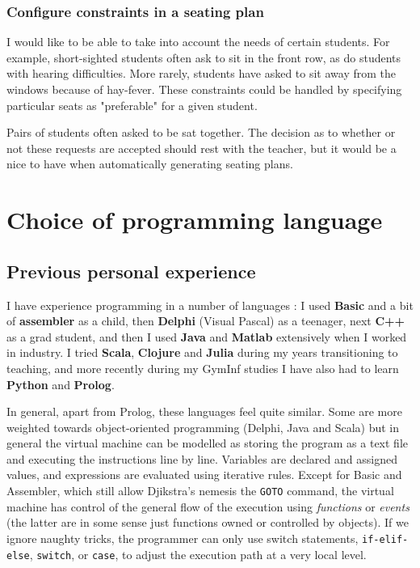 \documentclass[10pt]{article}
\begin{document}
\subsubsection{Configure constraints in a seating plan}
I would like to be able to take into account the needs of certain students. For example, short-sighted students often ask to sit in the front row, as do students with hearing difficulties. More rarely, students have asked to sit away from the windows because of hay-fever. These constraints could be handled by specifying particular seats as "preferable" for a given student.

Pairs of students often asked to be sat together. The decision as to whether or not these requests are accepted should rest with the teacher, but it would be a nice to have when automatically generating seating plans.


\section{Choice of programming language} \label{language}

\subsection{Previous personal experience}

I have experience programming in a number of languages : I used \textbf{Basic} and a bit of \textbf{assembler} as a child, then \textbf{Delphi} (Visual Pascal) as a teenager, next \textbf{C++} as a grad student, and then I used \textbf{Java} and \textbf{Matlab} extensively when I worked in industry. I tried \textbf{Scala}, \textbf{Clojure} and \textbf{Julia} during my years transitioning to teaching, and more recently during my GymInf studies I have also had to learn \textbf{Python} and \textbf{Prolog}.

In general, apart from Prolog, these languages feel quite similar. Some are more weighted towards object-oriented programming (Delphi, Java and Scala) but in general the virtual machine can be modelled as storing the program as a text file and executing the instructions line by line. Variables are declared and assigned values, and expressions are evaluated using iterative rules. Except for Basic and Assembler, which still allow Djikstra's nemesis the \texttt{GOTO} command, the virtual machine has control of the general flow of the execution using \emph{functions} or \emph{events} (the latter are in some sense just functions owned or controlled by objects). If we ignore naughty tricks, the programmer can only use switch statements, \texttt{if-elif-else}, \texttt{switch}, or \texttt{case}, to adjust the execution path at a very local level.
\end{document}
